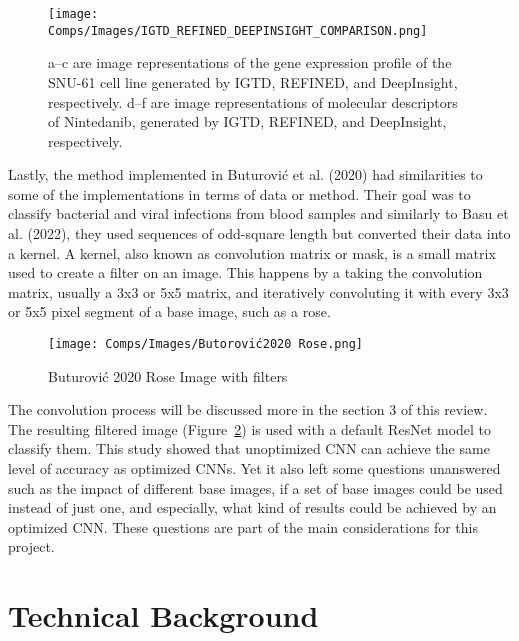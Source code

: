 \documentclass[10pt,twocolumn]{article}
\begin{document}
\begin{figure}[ht]
    \centering
    \texttt{[image: Comps/Images/IGTD\_REFINED\_DEEPINSIGHT\_COMPARISON.png]}
    \caption{a–c are image representations of the gene expression profile of the SNU-61 cell line generated by IGTD, REFINED, and DeepInsight, respectively. d–f are image representations of molecular descriptors of Nintedanib, generated by IGTD, REFINED, and DeepInsight, respectively.\cite{Zhu2021}}
    \label{Zhu2021Comparison}
\end{figure}

Lastly, the method implemented in Buturovi{\'c} et al. (2020) had similarities to some of the implementations in terms of data or method.
Their goal was to classify bacterial and viral infections from blood samples \cite{Buturovic2020} and similarly to Basu et al. (2022), they used sequences of odd-square length but converted their data into a kernel.
A kernel, also known as convolution matrix or mask, is a small matrix used to create a filter on an image.
This happens by a taking the convolution matrix, usually a 3x3 or 5x5 matrix, and iteratively convoluting it with every 3x3 or 5x5 pixel segment of a base image, such as a rose.


\begin{figure}[ht]
    \centering
    \texttt{[image: Comps/Images/Butorović2020 Rose.png]}
    \caption{Buturovi{\'c} 2020 Rose Image with filters}
    \label{Buturovic2020RwF}
\end{figure}

The convolution process will be discussed more in the section 3 of this review. The resulting filtered image (Figure~\ref{Buturovic2020RwF}) is used with a default ResNet model to classify them. This study showed that unoptimized CNN can achieve the same level of accuracy as optimized CNNs. Yet it also left some questions unanswered such as the impact of different base images, if a set of base images could be used instead of just one, and especially, what kind of results could be achieved by an optimized CNN. These questions are part of the main considerations for this project.

\section{Technical Background}
\end{document}
